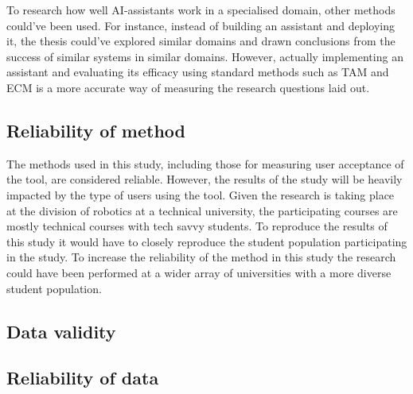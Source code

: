 

To research how well AI-assistants work in a specialised domain, other methods could’ve been used. For instance, instead of building an assistant and deploying it, the thesis could’ve explored similar domains and drawn conclusions from the success of similar systems in similar domains. However, actually implementing an assistant and evaluating its efficacy using standard methods such as \gls{TAM} and \gls{ECM} is a more accurate way of measuring the research questions laid out.


\subsection{Reliability of method}
\label{sec:reliabilityOfMethod}




The methods used in this study, including those for measuring user acceptance of the tool, are considered reliable. However, the results of the study will be heavily impacted by the type of users using the tool. Given the research is taking place at the division of robotics at a technical university, the participating courses are mostly technical courses with tech savvy students. To reproduce the results of this study it would have to closely reproduce the student population participating in the study. To increase the reliability of the method in this study the research could have been performed at a wider array of universities with a more diverse student population.


\subsection{Data validity}
\label{sec:dataValidity}




\subsection{Reliability of data}
\label{sec:reliabilityOfData}




